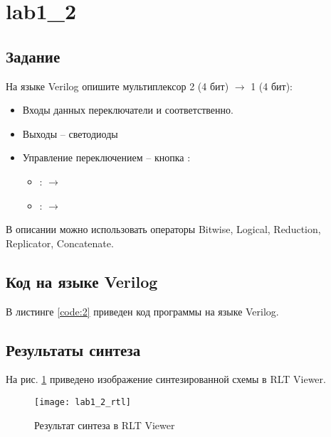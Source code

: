 \newpage

\section{lab1\_2}

\subsection{Задание}

На языке Verilog опишите мультиплексор 2 (4 бит) $\rightarrow$ 1 (4 бит):
\begin{itemize}
	\item Входы данных переключатели  и  соответственно.
	\item Выходы – светодиоды 
	\item Управление переключением – кнопка :
		\begin{itemize}
			\item {}:  $\rightarrow$ 
			\item {}:  $\rightarrow$ 
		\end{itemize}
\end{itemize}

В описании можно использовать операторы Bitwise, Logical, Reduction, Replicator, Concatenate.

\subsection{Код на языке Verilog}

В листинге \ref{code:2} приведен код программы на языке Verilog.



\subsection{Результаты синтеза}

На рис. \ref{fig:lab1_2_rtl} приведено изображение синтезированной схемы в RLT Viewer.

\begin{figure}[H]
\begin{center}
	\texttt{[image: lab1\_2\_rtl]}
	\caption{Результат синтеза в RLT Viewer}
	\label{fig:lab1_2_rtl}
\end{center}
\end{figure}

